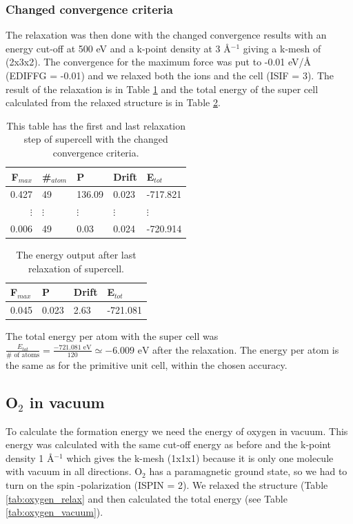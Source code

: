 \subsubsection{Changed convergence criteria}

The relaxation was then done with the changed convergence results with an energy cut-off at 500 eV and a k-point density at 3 Å$^{-1}$ giving a k-mesh of (2x3x2). The convergence for the maximum force was put to -0.01 eV/Å (EDIFFG = -0.01) and we relaxed both the ions and the cell (ISIF = 3). The result of the relaxation is in Table \ref{tab:ionstep_convergence_new} and the total energy of the super cell calculated from the relaxed structure is in Table \ref{tab:energy_supercell_after_relax_new}.

\begin{table}[H]\caption{This table has the first and last relaxation step of supercell with the changed convergence criteria.}\label{tab:ionstep_convergence_new}
\begin{tabular}{rllll}
F$_{max}$ &\#$_{atom}$&	P&	Drift&	E$_{tot}$\\ \hline
0.427&	49&	136.09&	0.023&	-717.821\\
$\vdots$&$\vdots$&$\vdots$&$\vdots$&$\vdots$\\
0.006&	49&	0.03&	0.024&	-720.914\\
\end{tabular}
\end{table}

\begin{table}[H]\caption{The energy output after last relaxation of supercell.}\label{tab:energy_supercell_after_relax_new}
\begin{tabular}{llll}
F$_{max}$ & P&	Drift&	E$_{tot}$\\ \hline
0.045&	0.023&	2.63	&-721.081\\
\end{tabular}
\end{table}

The total energy per atom with the super cell was $\frac{E_{tot}}{\# \text{ of atoms}} = \frac{-721.081 \text{ eV}}{120} \simeq -6.009 \text{ eV}$ after the relaxation. The energy per atom is the same as for the primitive unit cell, within the chosen accuracy. 

\subsection{O$_2$ in vacuum}

To calculate the formation energy we need the energy of oxygen in vacuum. This energy was calculated with the same cut-off energy as before and the k-point density 1 Å$^{-1}$ which gives the k-mesh (1x1x1) because it is only one molecule with vacuum in all directions. O$_2$ has a paramagnetic ground state, so we had to turn on the spin -polarization (ISPIN = 2). We relaxed the structure (Table \ref{tab:oxygen_relax} and then calculated the total energy (see Table \ref{tab:oxygen_vacuum}).

